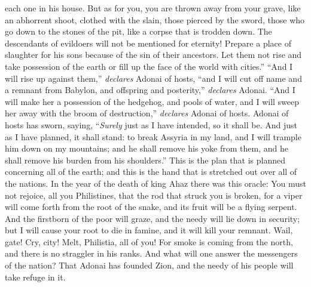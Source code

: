 \begin{biblechapter}
each one in his house.
\verse But as for you, you are thrown away from your grave, 
like an abhorrent shoot, 
clothed with the slain, 
those pierced by the sword, 
those who go down to the stones of the pit, 
like a corpse that is trodden down. The descendants of evildoers will not be mentioned for eternity!
\verse Prepare a place of slaughter for his sons 
because of the sin of their ancestors. 
Let them not rise and take possession of the earth 
or fill up the face of the world with cities.”
\verse “And I will rise up against them,” \textit{declares} Adonai of hosts, “and I will cut off name and a remnant from Babylon, 
and offspring and posterity,” \textit{declares} Adonai.
\verse “And I will make her a possession of the hedgehog, 
and pools of water, 
and I will sweep her away with the broom of destruction,” \textit{declares} Adonai of hosts.
 Adonai of hosts has sworn, saying,
\verse “\textit{Surely} just as I have intended, so it shall be. 
And just as I have planned, it shall stand:
\verse to break Assyria in my land, 
and I will trample him down on my mountains; 
and he shall remove his yoke from them, 
and he shall remove his burden from his shoulders.”
\verse This is the plan that is planned concerning all of the earth; 
and this is the hand that is stretched out over all of the nations.
 In the year of the death of king Ahaz there was this oracle:
\verse You must not rejoice, all you Philistines, 
that the rod that struck you is broken, 
for a viper will come forth from the root of the snake, 
and its fruit will be a flying serpent.
\verse And the firstborn of the poor will graze, 
and the needy will lie down in security; 
but I will cause your root to die in famine, 
and it will kill your remnant.
\verse Wail, gate! Cry, city! 
Melt, Philistia, all of you! 
For smoke is coming from the north, 
and there is no straggler in his ranks.
\verse And what will one answer the messengers of the nation? That Adonai has founded Zion, 
and the needy of his people will take refuge in it.
\end{biblechapter}

